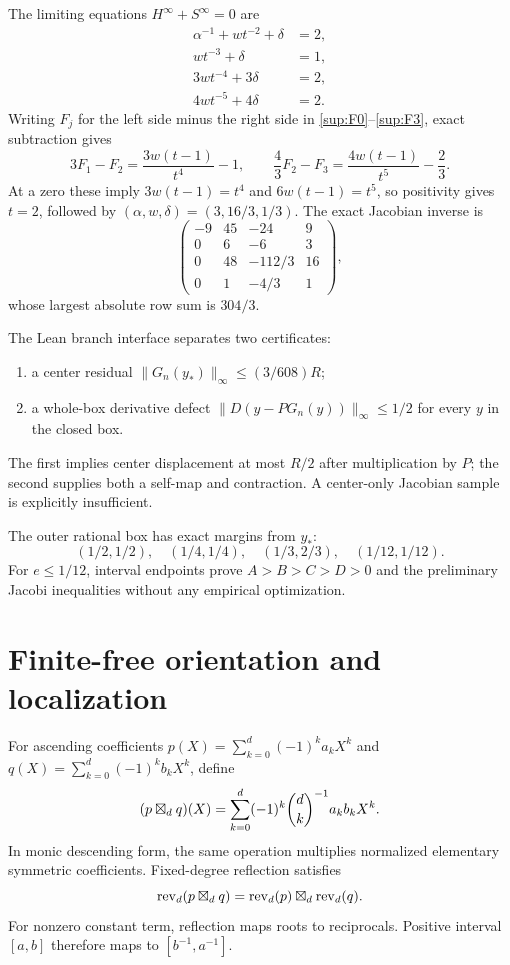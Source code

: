 \documentclass[10pt]{article}
\begin{document}
The limiting equations $H^\infty+S^\infty=0$ are
\begin{align}
 \alpha^{-1}+wt^{-2}+\delta&=2,\label{sup:F0}\\
 wt^{-3}+\delta&=1,\label{sup:F1}\\
 3wt^{-4}+3\delta&=2,\label{sup:F2}\\
 4wt^{-5}+4\delta&=2.\label{sup:F3}
\end{align}
Writing $F_j$ for the left side minus the right side in
\eqref{sup:F0}--\eqref{sup:F3}, exact subtraction gives
\[
 3F_1-F_2=\frac{3w(t-1)}{t^4}-1,
 \qquad
 \frac43F_2-F_3=\frac{4w(t-1)}{t^5}-\frac23.
\]
At a zero these imply $3w(t-1)=t^4$ and $6w(t-1)=t^5$, so positivity gives
$t=2$, followed by $(\alpha,w,\delta)=(3,16/3,1/3)$.  The exact Jacobian
inverse is
\begin{equation}\label{sup:inverse}
 \begin{pmatrix}
 -9&45&-24&9\\
 0&6&-6&3\\
 0&48&-112/3&16\\
 0&1&-4/3&1
 \end{pmatrix},
\end{equation}
whose largest absolute row sum is $304/3$.

The Lean branch interface separates two certificates:
\begin{enumerate}
\item a center residual
$\|G_n(y_*)\|_\infty\le(3/608)R$;
\item a whole-box derivative defect
$\|D(y-PG_n(y))\|_\infty\le1/2$ for every $y$ in the closed box.
\end{enumerate}
The first implies center displacement at most $R/2$ after multiplication by
$P$; the second supplies both a self-map and contraction.  A center-only
Jacobian sample is explicitly insufficient.

The outer rational box has exact margins from $y_*$:
\[
 (1/2,1/2),\quad(1/4,1/4),\quad(1/3,2/3),\quad(1/12,1/12).
\]
For $e\le1/12$, interval endpoints prove $A>B>C>D>0$ and the preliminary
Jacobi inequalities without any empirical optimization.

\section{Finite-free orientation and localization}\label{sup:finitefree}

For ascending coefficients
$p(X)=\sum_{k=0}^{d}(-1)^ka_kX^k$ and
$q(X)=\sum_{k=0}^{d}(-1)^kb_kX^k$, define
\begin{equation}\label{sup:ascending-conv}
 (p\boxtimes_d q)(X)=
 \sum_{k=0}^{d}(-1)^k\binom dk^{-1}a_kb_kX^k.
\end{equation}
In monic descending form, the same operation multiplies normalized elementary
symmetric coefficients.  Fixed-degree reflection satisfies
\[
 \operatorname{rev}_d(p\boxtimes_d q)
 =\operatorname{rev}_d(p)\boxtimes_d\operatorname{rev}_d(q).
\]
For nonzero constant term, reflection maps roots to reciprocals.  Positive
interval $[a,b]$ therefore maps to $[b^{-1},a^{-1}]$.
\end{document}
